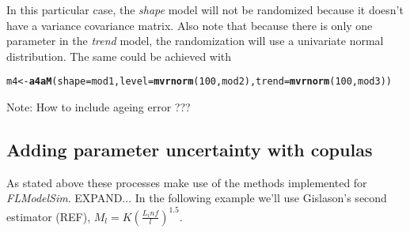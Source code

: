 \documentclass[a4paper,english,10pt]{article}\usepackage[]{graphicx}\usepackage[]{color}
\makeatletter
\newcommand{\hlnum}[1]{\textcolor[rgb]{0.686,0.059,0.569}{#1}}%
\newcommand{\hlstd}[1]{\textcolor[rgb]{0.345,0.345,0.345}{#1}}%
\newcommand{\hlkwb}[1]{\textcolor[rgb]{0.69,0.353,0.396}{#1}}%
\newcommand{\hlkwc}[1]{\textcolor[rgb]{0.333,0.667,0.333}{#1}}%
\newcommand{\hlkwd}[1]{\textcolor[rgb]{0.737,0.353,0.396}{\textbf{#1}}}%
\newenvironment{kframe}{%
 \def\at@end@of@kframe{}%
 \ifinner\ifhmode%
  \def\at@end@of@kframe{\end{minipage}}%
  \begin{minipage}{\columnwidth}%
 \fi\fi%
 \def\FrameCommand##1{\hskip\@totalleftmargin \hskip-\fboxsep
 \colorbox{shadecolor}{##1}\hskip-\fboxsep
     \hskip-\linewidth \hskip-\@totalleftmargin \hskip\columnwidth}%
 \MakeFramed {\advance\hsize-\width
   \@totalleftmargin\z@ \linewidth\hsize
   \@setminipage}}%
 {\par\unskip\endMakeFramed%
 \at@end@of@kframe}
\newenvironment{knitrout}{}{} %
\makeatother
\begin{document}
In this particular case, the \emph{shape} model will not be randomized because it doesn't have a variance covariance matrix. Also note that because there is only one parameter in the \emph{trend} model, the randomization will use a univariate normal distribution. The same could be achieved with

\begin{knitrout}
\color{fgcolor}\begin{kframe}
\begin{alltt}
\hlstd{m4} \hlkwb{<-} \hlkwd{a4aM}\hlstd{(}\hlkwc{shape} \hlstd{= mod1,} \hlkwc{level} \hlstd{=} \hlkwd{mvrnorm}\hlstd{(}\hlnum{100}\hlstd{, mod2),} \hlkwc{trend} \hlstd{=} \hlkwd{mvrnorm}\hlstd{(}\hlnum{100}\hlstd{, mod3))}
\end{alltt}
\end{kframe}
\end{knitrout}


Note: How to include ageing error ???

\subsection{Adding parameter uncertainty with copulas}

As stated above these processes make use of the methods implemented for \emph{FLModelSim}. EXPAND... In the following example we'll use Gislason's second estimator (REF), $M_l=K(\frac{L_inf}{l})^1.5$.
\end{document}
